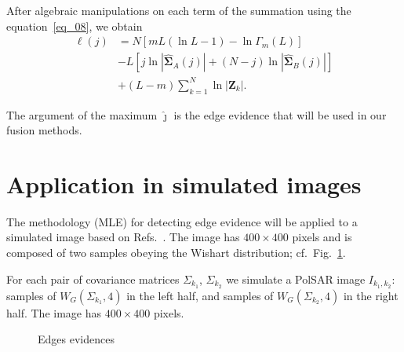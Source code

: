 \documentclass[conference]{IEEEtran}
\begin{document}
After algebraic manipulations on each term of the summation using the equation~\eqref{eq_08}, we obtain
\begin{align}\nonumber
	\ell(j)&=N\left[mL(\ln{L}-1)-\ln{\Gamma_m(L)}\right]\\\nonumber
	&- L\left[j\ln{|\mathbf{\widehat{\Sigma}}_{A}(j)|} +(N-j)\ln{|\mathbf{\widehat{\Sigma}}_{B}(j)|}\right] \\
	&+ (L-m)\sum_{k=1}^{N}\ln{|\mathbf{Z}_{k}|}.\label{eq_09}
\end{align}

The argument of the maximum $\widehat{\jmath}$ is the edge evidence that will be used in our fusion methods.

\section{Application in simulated images}\label{sec_06}

The methodology (MLE) for detecting edge evidence will be applied to a simulated image based on Refs.~\cite{nhfc,gamf}. 
The image has $400\times400$ pixels and is composed of two samples obeying the Wishart distribution; cf.\ Fig.~\ref{fig_Edges-Evidence}.

For each pair of covariance matrices $\Sigma_{k_1}$, $\Sigma_{k_2}$ we simulate a PolSAR image $I_{k_1,k_2}$: 
samples of $W_G(\Sigma_{k_1}, 4)$ in the left half, and 
samples of $W_G(\Sigma_{k_2}, 4)$ in the right half.
The image has $400 \times 400$ pixels.

\begin{figure}[hbt]
    \caption{Edges evidences}
     \label{fig_Edges-Evidence}
\end{figure}
\end{document}
